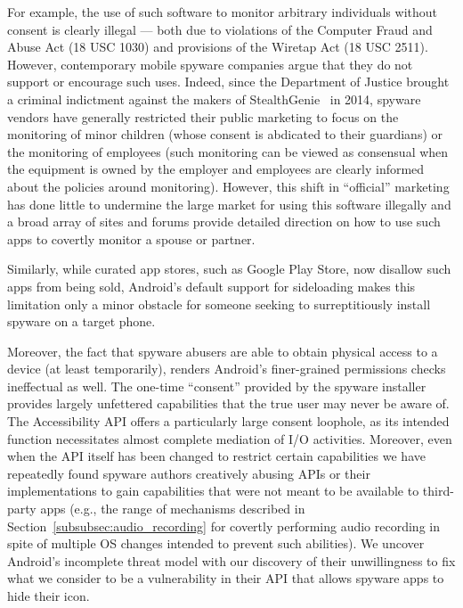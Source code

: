 \documentclass[sigconf,balance=false]{acmart}
\begin{document}
For example, the use of such software to monitor arbitrary individuals
without consent is clearly illegal --- both due to violations of the
Computer Fraud and Abuse Act (18 USC 1030) and provisions of the
Wiretap Act (18 USC 2511).  However, contemporary mobile spyware
companies argue that they do not support or encourage such uses.
Indeed, since the Department of Justice brought a criminal indictment
against the makers of StealthGenie~\cite{dojstealthgenie} in 2014,
spyware vendors have generally restricted their public marketing to
focus on the monitoring of minor children (whose consent is abdicated
to their guardians) or the monitoring of employees (such monitoring
can be viewed as consensual when the equipment is owned by the
employer and employees are clearly informed about the policies around
monitoring).  However, this shift in ``official'' marketing has done
little to undermine the large market for using this software illegally
and a broad array of sites and forums provide detailed direction on
how to use such apps to covertly monitor a spouse or partner.

Similarly, while curated app stores, such as Google Play Store, now
disallow such apps from being sold, Android's default support for
sideloading makes this limitation only a minor obstacle for someone
seeking to surreptitiously install spyware on a target phone.

Moreover, the fact that spyware abusers are able to obtain physical
access to a device (at least temporarily), renders Android's
finer-grained permissions checks ineffectual as well.  The one-time
``consent'' provided by the spyware installer provides largely
unfettered capabilities that the true user may never be aware of.  The
Accessibility API offers a particularly large consent loophole, as its
intended function necessitates almost complete mediation of I/O
activities.  Moreover, even when the API itself has been changed to
restrict certain capabilities we have repeatedly found spyware authors
creatively abusing APIs or their implementations to gain capabilities
that were not meant to be available to third-party apps
(e.g., the range of mechanisms described in
Section~\ref{subsubsec:audio_recording} for covertly performing audio
recording in spite of multiple OS changes intended to prevent such
abilities). We uncover Android's incomplete threat model
with our discovery of their unwillingness to fix what
we consider to be a vulnerability in their API that allows spyware apps to
hide their icon.
\end{document}

